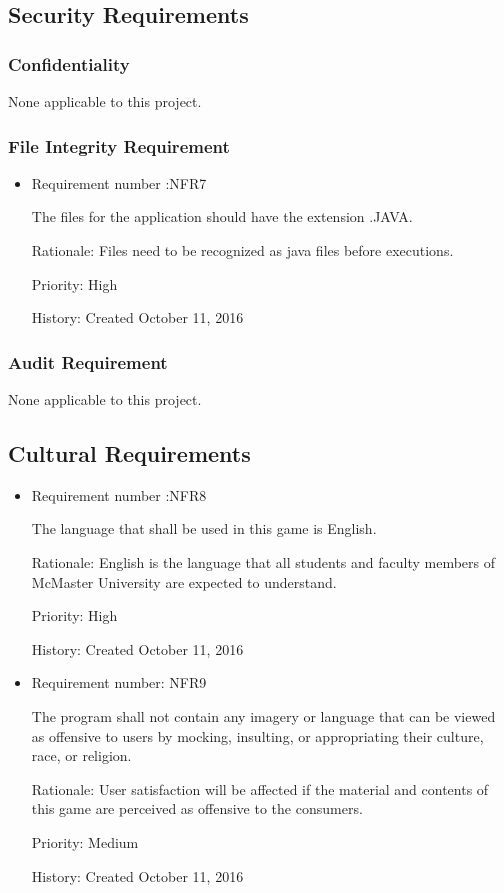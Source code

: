 \documentclass[12pt,letterpaper]{article}
\begin{document}
\subsection{Security Requirements}
\subsubsection{Confidentiality}
None applicable to this project.
\subsubsection{File Integrity Requirement}
\begin{itemize}
	\item Requirement number :NFR7   
	
	The files for the application should have the extension .JAVA.

	Rationale: Files need to be recognized as java files before executions.
	
	Priority: High     
	 
	History: Created October 11, 2016  
\end{itemize}
\subsubsection{Audit Requirement}
None applicable to this project.
\subsection{Cultural Requirements}
\begin{itemize}
	\item Requirement number :NFR8 
	
	The language that shall be used in this game is English.

	Rationale: English is the language that all students and faculty members of McMaster University are expected to understand.

	Priority: High
	
	History: Created October 11, 2016

	\item Requirement number: NFR9

	The program shall not contain any imagery or language that can be viewed as offensive to users by mocking, insulting, or appropriating their culture, race, or religion.

	Rationale: User satisfaction will be affected if the material and contents of this game are perceived as offensive to the consumers.

	Priority: Medium

	History: Created October 11, 2016
\end{itemize}
\end{document}
